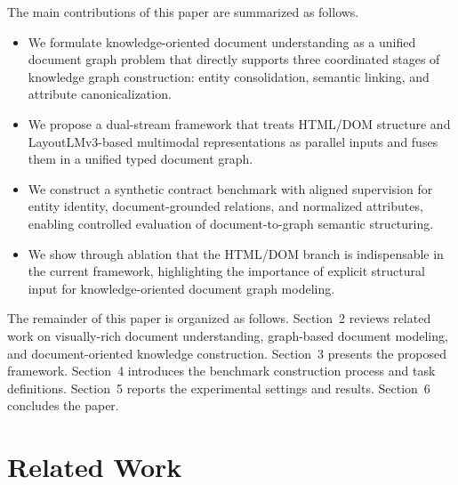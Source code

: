 \documentclass[pdflatex,twocolumn,iicol,sn-vancouver-num]{sn-jnl}%
\theoremstyle{thmstyleone}%
\theoremstyle{thmstyletwo}%
\theoremstyle{thmstylethree}%
\begin{document}
The main contributions of this paper are summarized as follows.
\begin{itemize}
    \item We formulate knowledge-oriented document understanding as a unified document graph problem that directly supports three coordinated stages of knowledge graph construction: entity consolidation, semantic linking, and attribute canonicalization.
    \item We propose a dual-stream framework that treats HTML/DOM structure and LayoutLMv3-based multimodal representations as parallel inputs and fuses them in a unified typed document graph.
    \item We construct a synthetic contract benchmark with aligned supervision for entity identity, document-grounded relations, and normalized attributes, enabling controlled evaluation of document-to-graph semantic structuring.
    \item We show through ablation that the HTML/DOM branch is indispensable in the current framework, highlighting the importance of explicit structural input for knowledge-oriented document graph modeling.
\end{itemize}

The remainder of this paper is organized as follows. Section~2 reviews related work on visually-rich document understanding, graph-based document modeling, and document-oriented knowledge construction. Section~3 presents the proposed framework. Section~4 introduces the benchmark construction process and task definitions. Section~5 reports the experimental settings and results. Section~6 concludes the paper.



\section{Related Work}
\end{document}
